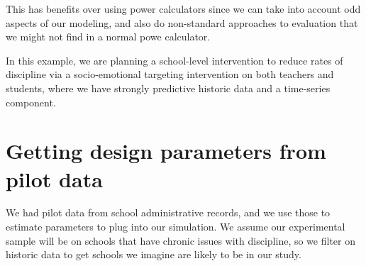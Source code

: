 \documentclass[
]{book}
\begin{document}
This has benefits over using power calculators since we can take into account odd aspects of our modeling, and also do non-standard approaches to evaluation that we might not find in a normal powe calculator.

In this example, we are planning a school-level intervention to reduce rates of discipline via a socio-emotional targeting intervention on both teachers and students, where we have strongly predictive historic data and a time-series component.

\hypertarget{getting-design-parameters-from-pilot-data}{%
\section{Getting design parameters from pilot data}\label{getting-design-parameters-from-pilot-data}}

We had pilot data from school administrative records, and we use those to estimate parameters to plug into our simulation.
We assume our experimental sample will be on schools that have chronic issues
with discipline, so we filter on historic data to get schools we imagine are likely to be in our study.
\end{document}
